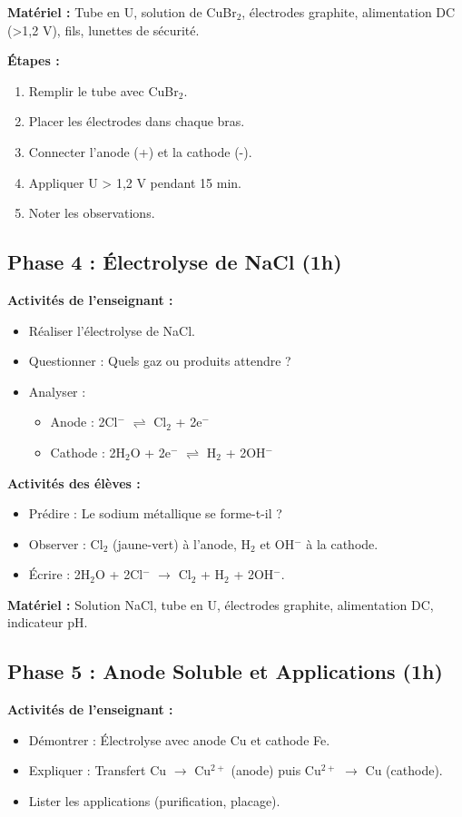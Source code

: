 \documentclass[12pt]{article}
\begin{document}
\textbf{Matériel :} Tube en U, solution de CuBr\(_{2}\), électrodes graphite, alimentation DC (>1,2 V), fils, lunettes de sécurité.

\textbf{Étapes :}
\begin{enumerate}
    \item Remplir le tube avec CuBr\(_{2}\).
    \item Placer les électrodes dans chaque bras.
    \item Connecter l’anode (+) et la cathode (-).
    \item Appliquer U > 1,2 V pendant 15 min.
    \item Noter les observations.
\end{enumerate}

\subsection{Phase 4 : Électrolyse de NaCl (1h)}
\textbf{Activités de l’enseignant :}
\begin{itemize}
    \item Réaliser l’électrolyse de NaCl.
    \item Questionner : Quels gaz ou produits attendre ?
    \item Analyser :
    \begin{itemize}
        \item Anode : 2Cl\(^-\) \(\rightleftharpoons\) Cl\(_{2}\) + 2e\(^-\)
        \item Cathode : 2H\(_{2}\)O + 2e\(^-\) \(\rightleftharpoons\) H\(_{2}\) + 2OH\(^-\)
    \end{itemize}
\end{itemize}

\textbf{Activités des élèves :}
\begin{itemize}
    \item Prédire : Le sodium métallique se forme-t-il ?
    \item Observer : Cl\(_{2}\) (jaune-vert) à l’anode, H\(_{2}\) et OH\(^-\) à la cathode.
    \item Écrire : 2H\(_{2}\)O + 2Cl\(^-\) \(\longrightarrow\) Cl\(_{2}\) + H\(_{2}\) + 2OH\(^-\).
\end{itemize}

\textbf{Matériel :} Solution NaCl, tube en U, électrodes graphite, alimentation DC, indicateur pH.

\subsection{Phase 5 : Anode Soluble et Applications (1h)}
\textbf{Activités de l’enseignant :}
\begin{itemize}
    \item Démontrer : Électrolyse avec anode Cu et cathode Fe.
    \item Expliquer : Transfert Cu \(\rightarrow\) Cu\(^{2+}\) (anode) puis Cu\(^{2+}\) \(\rightarrow\) Cu (cathode).
    \item Lister les applications (purification, placage).
\end{itemize}
\end{document}
